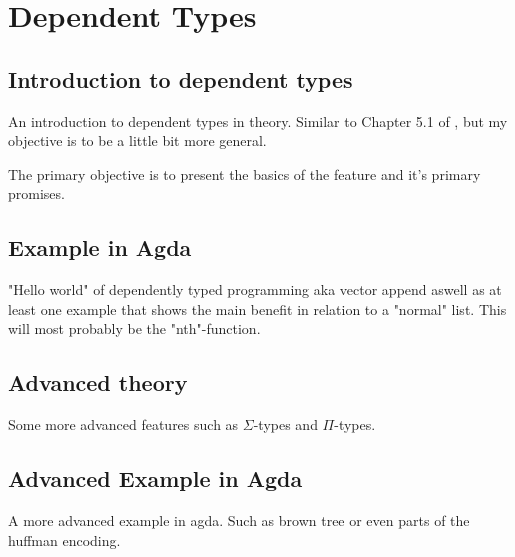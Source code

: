 \section{Dependent Types}
\subsection{Introduction to dependent types}
An introduction to dependent types in theory. Similar to Chapter 5.1 of \cite{10.1145/2841316}, but my objective is to be a little bit more general.

The primary objective is to present the basics of the feature and it's primary promises.

\subsection{Example in Agda}
"Hello world" of dependently typed programming aka vector append aswell as at least one example that shows the main benefit in relation to a "normal" list.
This will most probably be the "nth"-function.

\subsection{Advanced theory}
Some more advanced features such as $\Sigma$-types and $\Pi$-types.

\subsection{Advanced Example in Agda}
A more advanced example in agda. Such as brown tree or even parts of the huffman encoding.